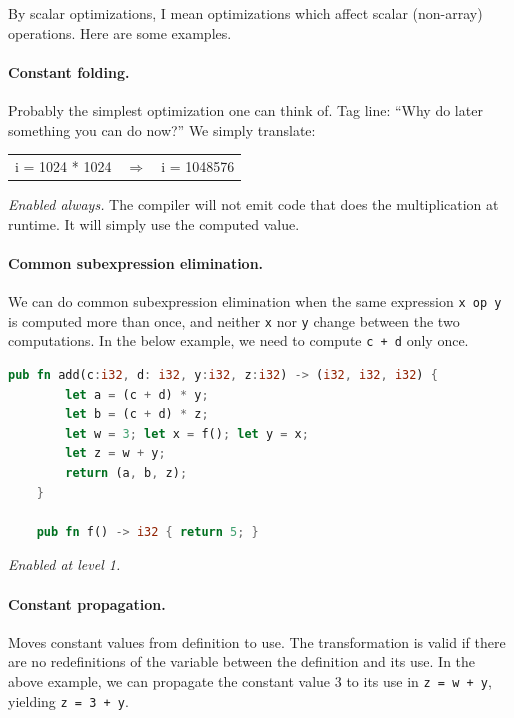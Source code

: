 \documentclass[a4paper]{report}
\begin{document}
By scalar optimizations, I mean optimizations
which affect scalar (non-array) operations. Here are some examples.

\paragraph{Constant folding.} Probably the simplest optimization one can think of.
Tag line: ``Why do later something you can do now?'' We simply translate:

\begin{center}
\vspace*{-1em}
\begin{tabular}{lll}
i = 1024 * 1024 &
$\Longrightarrow$ &
i = 1048576
\end{tabular}
\end{center}

\noindent \emph{Enabled always.} The compiler will not emit
code that does the multiplication at runtime. It will simply use the
computed value.

\paragraph{Common subexpression elimination.} We can do common subexpression elimination
when the same expression {\tt x op y} is computed more than once, and
neither {\tt x} nor {\tt y} change between the two computations. In the
below example, we need to compute {\tt c + d} only once.


\begin{lstlisting}[language=Rust]
    pub fn add(c:i32, d: i32, y:i32, z:i32) -> (i32, i32, i32) {
        let a = (c + d) * y;
        let b = (c + d) * z;
        let w = 3; let x = f(); let y = x;
        let z = w + y;
        return (a, b, z);
    }

    pub fn f() -> i32 { return 5; }
\end{lstlisting}

\noindent \emph{Enabled at level 1.}

\paragraph{Constant propagation.} Moves constant values from definition to
use. The transformation is valid if there are no redefinitions of the
variable between the definition and its use. In the above example,
we can propagate the constant value 3 to its use in {\tt z = w + y},
yielding {\tt z = 3 + y}.
\end{document}
